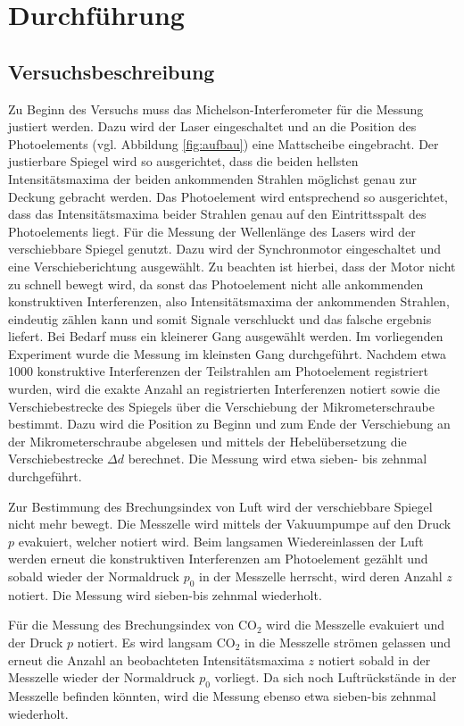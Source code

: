 \section{Durchführung}
\label{sec:Durchführung}



\subsection{Versuchsbeschreibung}
\label{sec:Versuchsbeschreibung}
Zu Beginn des Versuchs muss das Michelson-Interferometer für die Messung justiert werden.
Dazu wird der Laser eingeschaltet und an die Position des Photoelements (vgl. Abbildung \ref{fig:aufbau}) eine Mattscheibe eingebracht.
Der justierbare Spiegel wird so ausgerichtet, dass die beiden hellsten Intensitätsmaxima der beiden ankommenden Strahlen möglichst genau zur Deckung gebracht werden. Das Photoelement wird entsprechend so ausgerichtet, dass das Intensitätsmaxima beider Strahlen genau auf den Eintrittsspalt des Photoelements liegt.
Für die Messung der Wellenlänge des Lasers wird der verschiebbare Spiegel genutzt.
Dazu wird der Synchronmotor eingeschaltet und eine Verschieberichtung ausgewählt.
Zu beachten ist hierbei, dass der Motor nicht zu schnell bewegt wird, da sonst das Photoelement nicht alle ankommenden konstruktiven Interferenzen, also Intensitätsmaxima der ankommenden Strahlen, eindeutig zählen kann und somit Signale verschluckt und das falsche ergebnis liefert.
Bei Bedarf muss ein kleinerer Gang ausgewählt werden. Im vorliegenden Experiment wurde die Messung im kleinsten Gang durchgeführt.
Nachdem etwa 1000 konstruktive Interferenzen der Teilstrahlen am Photoelement registriert wurden, wird die exakte Anzahl an registrierten Interferenzen notiert sowie die Verschiebestrecke des Spiegels über die Verschiebung der Mikrometerschraube bestimmt. Dazu wird die Position zu Beginn und zum Ende der Verschiebung an der Mikrometerschraube abgelesen und mittels der Hebelübersetzung die Verschiebestrecke $\Delta d$ berechnet.
Die Messung wird etwa sieben- bis zehnmal durchgeführt.

Zur Bestimmung des Brechungsindex von Luft wird der verschiebbare Spiegel nicht mehr bewegt.
Die Messzelle wird mittels der Vakuumpumpe auf den Druck $p$ evakuiert, welcher notiert wird. Beim langsamen Wiedereinlassen der Luft werden erneut die konstruktiven Interferenzen am Photoelement gezählt und sobald wieder der Normaldruck $p_{\mathrm{0}}$ in der Messzelle herrscht, wird deren Anzahl $z$ notiert. Die Messung wird sieben-bis zehnmal wiederholt.

Für die Messung des Brechungsindex von $\mathrm{CO_2}$ wird die Messzelle evakuiert und der Druck $p$ notiert.
Es wird langsam $\mathrm{CO_2}$ in die Messzelle strömen gelassen und erneut die Anzahl an beobachteten Intensitätsmaxima $z$ notiert sobald in der Messzelle wieder der Normaldruck $p_0$ vorliegt.
Da sich noch Luftrückstände in der Messzelle befinden könnten, wird die Messung ebenso etwa sieben-bis zehnmal wiederholt.
